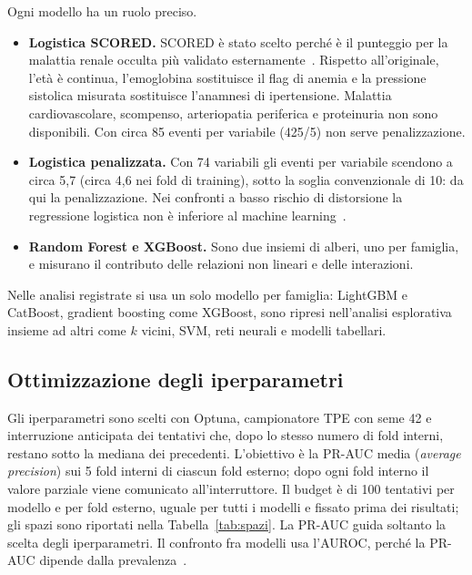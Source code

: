 \documentclass[a4paper, 12pt, oneside]{book}
\begin{document}
Ogni modello ha un ruolo preciso.
\begin{itemize}
	\item \textbf{Logistica SCORED.} SCORED è stato scelto perché è il punteggio per la malattia renale occulta più validato esternamente~\cite{echouffo-tcheugui_risk_2012}. Rispetto all'originale, l'età è continua, l'emoglobina sostituisce il flag di anemia e la pressione sistolica misurata sostituisce l'anamnesi di ipertensione. Malattia cardiovascolare, scompenso, arteriopatia periferica e proteinuria non sono disponibili. Con circa 85 eventi per variabile (425/5) non serve penalizzazione.
	
	\item \textbf{Logistica penalizzata.} Con 74 variabili gli eventi per variabile scendono a circa 5,7 (circa 4,6 nei fold di training), sotto la soglia convenzionale di 10: da qui la penalizzazione. Nei confronti a basso rischio di distorsione la regressione logistica non è inferiore al machine learning~\cite{christodoulou_systematic_2019}.
	
	\item \textbf{Random Forest e XGBoost.} Sono due insiemi di alberi, uno per famiglia, e misurano il contributo delle relazioni non lineari e delle interazioni.
\end{itemize}

Nelle analisi registrate si usa un solo modello per famiglia: LightGBM e CatBoost, gradient boosting come XGBoost, sono ripresi nell'analisi esplorativa insieme ad altri come $k$ vicini, SVM, reti neurali e modelli tabellari.

\subsection{Ottimizzazione degli iperparametri}

Gli iperparametri sono scelti con Optuna, campionatore TPE con seme 42 e interruzione anticipata dei tentativi che, dopo lo stesso numero di fold interni, restano sotto la mediana dei precedenti. L'obiettivo è la PR-AUC media (\textit{average precision}) sui 5 fold interni di ciascun fold esterno; dopo ogni fold interno il valore parziale viene comunicato all'interruttore. Il budget è di 100 tentativi per modello e per fold esterno, uguale per tutti i modelli e fissato prima dei risultati; gli spazi sono riportati nella Tabella~\ref{tab:spazi}. La PR-AUC guida soltanto la scelta degli iperparametri. Il confronto fra modelli usa l'AUROC, perché la PR-AUC dipende dalla prevalenza~\cite{van_calster_evaluation_2025}.
\end{document}
